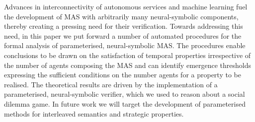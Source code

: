Advances in interconnectivity of autonomous services and machine learning fuel
the development of MAS with arbitrarily many neural-symbolic components,
thereby creating a pressing need for their verification. Towards addressing
this need, in this paper we put forward a number of automated procedures for
the formal analysis of parameterised, neural-symbolic MAS. The procedures
enable conclusions to be drawn on the satisfaction of temporal properties
irrespective of the number of agents composing the MAS and can identify
emergence thresholds expressing the sufficient conditions on the number agents
for a property to be realised. The theoretical results are driven by the
implementation of a parameterised, neural-symbolic verifier, which we used to
reason about a social dilemma game. In future work we will target the
development of parameterised methods for interleaved semantics and strategic properties.

